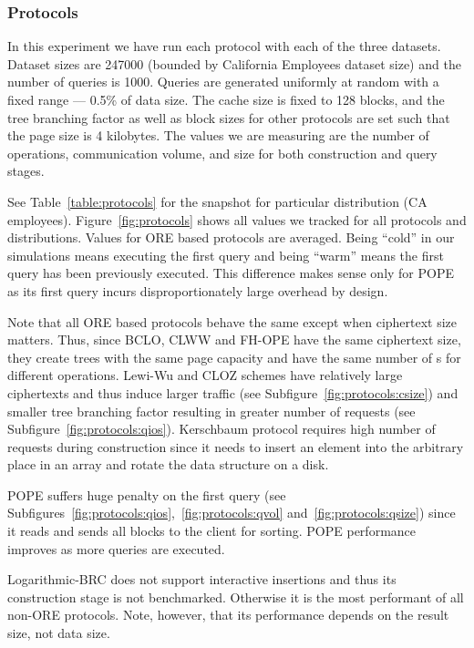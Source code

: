 		\subsubsection{Protocols}\label{sec:results-protocols}

			In this experiment we have run each protocol with each of the three datasets.
			Dataset sizes are 247000 (bounded by California Employees dataset size) and the number of queries is 1000.
			Queries are generated uniformly at random with a fixed range --- 0.5\% of data size.
			The cache size is fixed to 128 blocks, and the {\BPlus} tree branching factor as well as block sizes for other protocols are set such that the page size is 4 kilobytes.
			The values we are measuring are the number of {\IO} operations, communication volume, and size for both construction and query stages.

			See Table~\ref{table:protocols} for the snapshot for particular distribution (CA employees).
			Figure~\ref{fig:protocols} shows all values we tracked for all protocols and distributions.
			Values for ORE based protocols are averaged.
			Being ``cold'' in our simulations means executing the first query and being ``warm'' means the first query has been previously executed.
			This difference makes sense only for POPE as its first query incurs disproportionately large overhead by design.

			Note that all ORE based protocols behave the same except when ciphertext size matters.
			Thus, since BCLO, CLWW and FH-OPE have the same ciphertext size, they create {\BPlus} trees with the same page capacity and have the same number of {\IO}s for different operations.
			Lewi-Wu and CLOZ schemes have relatively large ciphertexts and thus induce larger traffic (see Subfigure~\ref{fig:protocols:csize}) and smaller {\BPlus} tree branching factor resulting in greater number of {\IO} requests (see Subfigure~\ref{fig:protocols:qios}).
			Kerschbaum protocol requires high number of {\IO} requests during construction since it needs to insert an element into the arbitrary place in an array and rotate the data structure on a disk.

			POPE suffers huge penalty on the first query (see Subfigures~\ref{fig:protocols:qios},~\ref{fig:protocols:qvol} and~\ref{fig:protocols:qsize}) since it reads and sends all blocks to the client for sorting.
			POPE performance improves as more queries are executed.

			Logarithmic\hyp{}BRC does not support interactive insertions and thus its construction stage is not benchmarked.
			Otherwise it is the most performant of all non-ORE protocols.
			Note, however, that its performance depends on the result size, not data size.

